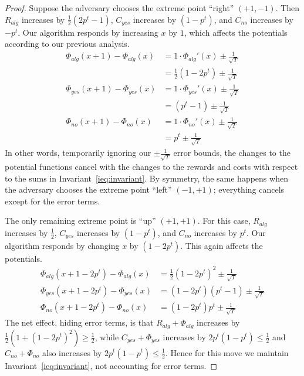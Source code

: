 \documentclass[final,12pt]{colt2018}
\newcommand{\RewardAlg}{R_{alg}}
\newcommand{\CostYes}{C_{yes}}
\newcommand{\CostNo}{C_{no}}
\newcommand{\Potential}{\Phi}
\newcommand{\PotentialAlg}{\Potential_{alg}}
\newcommand{\PotentialYes}{\Potential_{yes}}
\newcommand{\PotentialNo}{\Potential_{no}}
\begin{document}
\begin{proof}
  Suppose the adversary chooses the extreme point ``right'' $(+1, -1)$. Then $\RewardAlg$ increases by $\frac12 (2p^t-1)$, $\CostYes$ increases by $(1 - p^t)$, and $\CostNo$ increases by $-p^t$. Our algorithm responds by increasing $x$ by $1$, which affects the potentials according to our previous analysis.
  \begin{align*}
    \PotentialAlg(x+1) - \PotentialAlg(x)
      &= 1 \cdot \PotentialAlg'(x) \pm \frac{1}{\sqrt{T}} \\
      &= \frac12 (1 - 2p^t) \pm \frac{1}{\sqrt{T}} \\
    \PotentialYes(x+1) - \PotentialYes(x)
      &= 1 \cdot \PotentialYes'(x) \pm \frac{1}{\sqrt{T}} \\
      &= (p^t - 1) \pm \frac{1}{\sqrt{T}} \\
    \PotentialNo(x+1) - \PotentialNo(x)
      &= 1 \cdot \PotentialNo'(x) \pm \frac{1}{\sqrt{T}} \\
      &= p^t \pm \frac{1}{\sqrt{T}}
  \end{align*}
  In other words, temporarily ignoring our $\pm \frac{1}{\sqrt{T}}$ error bounds, the changes to the potential functions cancel with the changes to the rewards and costs with respect to the sums in Invariant~\ref{ieq:invariant}. By symmetry, the same happens when the adversary chooses the extreme point ``left'' $(-1, +1)$; everything cancels except for the error terms.

  The only remaining extreme point is ``up'' $(+1, +1)$. For this case, $\RewardAlg$ increases by $\frac12$, $\CostYes$ increases by $(1 - p^t)$, and $\CostNo$ increases by $p^t$. Our algorithm responds by changing $x$ by $(1 - 2p^t)$. This again affects the potentials.
  \begin{align*}
    \PotentialAlg(x+1-2p^t) - \PotentialAlg(x)
      &= \frac12 (1 - 2p^t)^2 \pm \frac{1}{\sqrt{T}} \\
    \PotentialYes(x+1-2p^t) - \PotentialYes(x)
      &= (1-2p^t) (p^t - 1) \pm \frac{1}{\sqrt{T}} \\
    \PotentialNo(x+1-2p^t) - \PotentialNo(x)
      &= (1-2p^t) p^t \pm \frac{1}{\sqrt{T}}
  \end{align*}
  The net effect, hiding error terms, is that $\RewardAlg + \PotentialAlg$ increases by $\frac12 (1 + (1-2p^t)^2) \ge \frac12$, while $\CostYes + \PotentialYes$ increases by $2p^t(1-p^t) \le \frac12$ and $\CostNo + \PotentialNo$ also increases by $2p^t(1-p^t) \le \frac12$. Hence for this move we maintain Invariant~\ref{ieq:invariant}, not accounting for error terms.


\end{proof}
\end{document}
